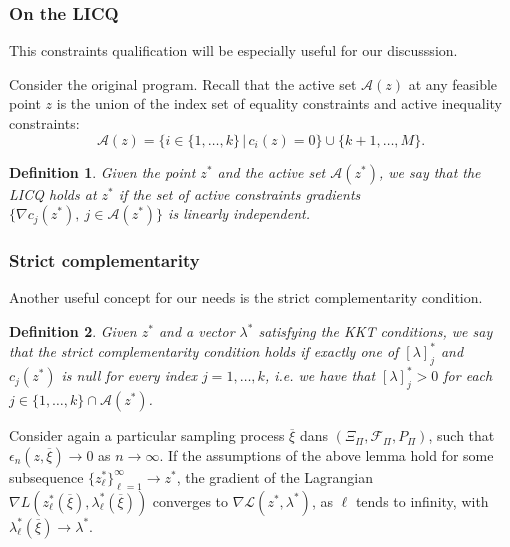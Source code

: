 \documentclass{beamer}
\newtheorem{defi}{Definition}
\begin{document}
\begin{frame}
\frametitle{On the LICQ}

This constraints qualification will be especially useful for our discusssion.

\mbox{}

Consider the original program.
Recall that the active set $\mathcal{A}(z)$ at any feasible point $z$ is the union of the index set of equality constraints and active inequality constraints:
\[
\mathcal{A}(z) = \lbrace i \in \lbrace 1,\ldots,k \rbrace \, | \,
c_i(z) = 0 \rbrace \cup \lbrace k+1,\ldots,M \rbrace.
\]

\begin{defi}
Given the point $z^*$ and the active set $\mathcal{A}(z^*)$, we say that the LICQ holds at $z^*$ if the set of active constraints gradients $\lbrace \nabla c_j(z^*),\ j \in \mathcal{A}(z^*) \rbrace$ is linearly independent.
\end{defi}

\end{frame}

\begin{frame}
\frametitle{Strict complementarity}

Another useful concept for our needs is the strict complementarity condition.

\begin{defi}
Given $z^*$ and a vector $\lambda^*$ satisfying the KKT conditions, we say that the strict complementarity condition holds if exactly one of $[\lambda]_j^*$ and $c_j(z^*)$ is null for every index $j=1,\ldots,k$, i.e. we have that $[\lambda]_j^* > 0$ for each $j \in \lbrace 1,\ldots,k \rbrace \cap \mathcal{A}(z^*)$.
\end{defi}

\mbox{}

Consider again a particular sampling process $\overline{\xi}$ dans $(\Xi_{\Pi}, \mathcal{F}_{\Pi}, P_{\Pi})$, such that $\epsilon_n (z, \overline{\xi} ) \rightarrow 0$ as $n \rightarrow \infty$. 
If the assumptions of the above lemma hold for some subsequence $\lbrace z_{\ell}^* \rbrace_{\ell = 1}^{\infty} \rightarrow z^*$, the gradient of the Lagrangian $\nabla L\left( z^*_{\ell} ( \overline{\xi} ), \lambda_{\ell}^* ( \overline{\xi} ) \right)$ converges to $\nabla \mathcal{L} ( z^*, \lambda^* )$, as $\ell$ tends to infinity, with $\lambda_{\ell}^*(\overline{\xi}) \rightarrow \lambda^*$.

\end{frame}
\end{document}
